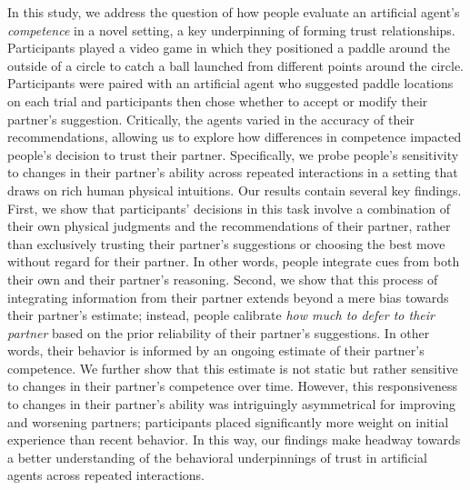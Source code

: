\documentclass[10pt,letterpaper]{article}
\begin{document}
In this study, we address the question of how people evaluate an artificial agent's \textit{competence} in a novel setting, a key underpinning of forming trust relationships. Participants played a video game in which they positioned a paddle around the outside of a circle to catch a ball launched from different points around the circle. Participants were paired with an artificial agent who suggested paddle locations on each trial and participants then chose whether to accept or modify their partner's suggestion. Critically, the agents varied in the accuracy of their recommendations, allowing us to explore how differences in competence impacted people's decision to trust their partner. Specifically, we probe people's sensitivity to changes in their partner's ability across repeated interactions in a setting that draws on rich human physical intuitions. Our results contain several key findings. First, we show that participants' decisions in this task involve a combination of their own physical judgments and the recommendations of their partner, rather than exclusively trusting their partner's suggestions or choosing the best move without regard for their partner. In other words, people integrate cues from both their own and their partner's reasoning. Second, we show that this process of integrating information from their partner extends beyond a mere bias towards their partner's estimate; instead, people calibrate \textit{how much to defer to their partner} based on the prior reliability of their partner's suggestions. In other words, their behavior is informed by an ongoing estimate of their partner's competence. We further show that this estimate is not static but rather sensitive to changes in their partner's competence over time. However, this responsiveness to changes in their partner's ability was intriguingly asymmetrical for improving and worsening partners; participants placed significantly more weight on initial experience than recent behavior. In this way, our findings make headway towards a better understanding of the behavioral underpinnings of trust in artificial agents across repeated interactions. 
\end{document}
